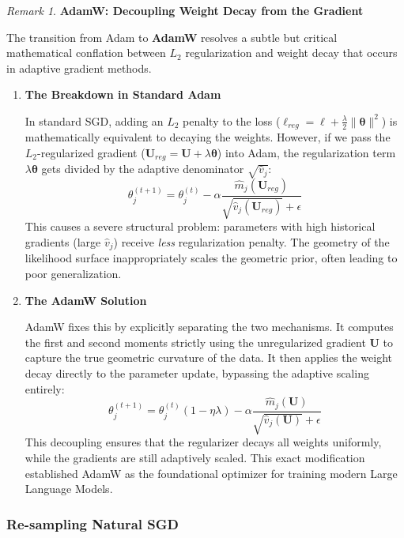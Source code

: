 \documentclass[
  letterpaper,
  DIV=11,
  numbers=noendperiod]{scrreprt}
\renewcommand{\[}{\begin{equation}}
\renewcommand{\]}{\end{equation}}
\theoremstyle{definition}
\theoremstyle{plain}
\theoremstyle{plain}
\theoremstyle{plain}
\theoremstyle{definition}
\theoremstyle{plain}
\theoremstyle{remark}
\newtheorem{refremark}{Remark}[chapter]
\begin{document}
\begin{refremark}
\textbf{AdamW: Decoupling Weight Decay from the Gradient}

The transition from Adam to \textbf{AdamW} resolves a subtle but
critical mathematical conflation between \(L_2\) regularization and
weight decay that occurs in adaptive gradient methods.

\begin{enumerate}
\def\labelenumi{\arabic{enumi}.}
\item
  \textbf{The Breakdown in Standard Adam}

  In standard SGD, adding an \(L_2\) penalty to the loss
  (\(\ell_{reg} = \ell + \frac{\lambda}{2} \|\boldsymbol{\theta}\|^2\))
  is mathematically equivalent to decaying the weights. However, if we
  pass the \(L_2\)-regularized gradient
  (\(\mathbf{U}_{reg} = \mathbf{U} + \lambda \boldsymbol{\theta}\)) into
  Adam, the regularization term \(\lambda \boldsymbol{\theta}\) gets
  divided by the adaptive denominator \(\sqrt{\hat{v}_j}\): \[
  \theta_j^{(t+1)} = \theta_j^{(t)} - \alpha \frac{\hat{m}_j(\mathbf{U}_{reg})}{\sqrt{\hat{v}_j(\mathbf{U}_{reg})} + \epsilon}
  \] This causes a severe structural problem: parameters with high
  historical gradients (large \(\hat{v}_j\)) receive \emph{less}
  regularization penalty. The geometry of the likelihood surface
  inappropriately scales the geometric prior, often leading to poor
  generalization.
\item
  \textbf{The AdamW Solution}

  AdamW fixes this by explicitly separating the two mechanisms. It
  computes the first and second moments strictly using the unregularized
  gradient \(\mathbf{U}\) to capture the true geometric curvature of the
  data. It then applies the weight decay directly to the parameter
  update, bypassing the adaptive scaling entirely: \[
  \theta_j^{(t+1)} = \theta_j^{(t)} (1 - \eta \lambda) - \alpha \frac{\hat{m}_j(\mathbf{U})}{\sqrt{\hat{v}_j(\mathbf{U})} + \epsilon}
  \] This decoupling ensures that the regularizer decays all weights
  uniformly, while the gradients are still adaptively scaled. This exact
  modification established AdamW as the foundational optimizer for
  training modern Large Language Models.
\end{enumerate}

\label{rem-adamw-weight-decay}

\end{refremark}

\subsubsection{Re-sampling Natural SGD}\label{re-sampling-natural-sgd}
\end{document}
